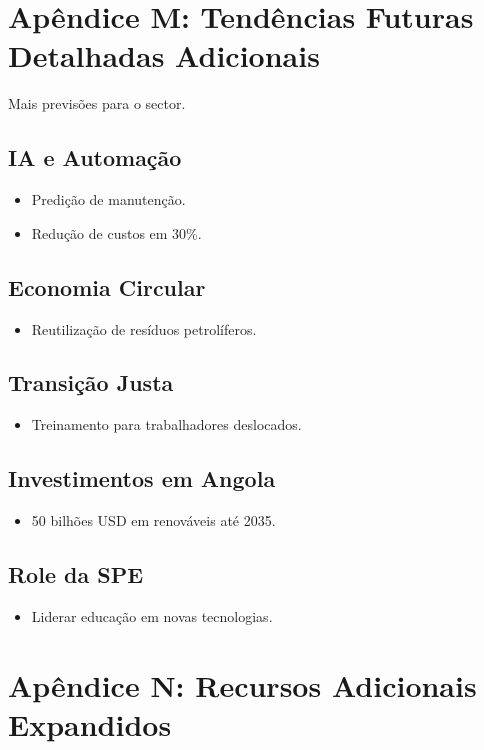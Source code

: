 \documentclass[12pt]{article}
\begin{document}
\clearpage
\section{Apêndice M: Tendências Futuras Detalhadas Adicionais}

Mais previsões para o sector.

\subsection{IA e Automação}
\begin{itemize}
    \item Predição de manutenção.
    \item Redução de custos em 30\%.
\end{itemize}

\subsection{Economia Circular}
\begin{itemize}
    \item Reutilização de resíduos petrolíferos.
\end{itemize}

\subsection{Transição Justa}
\begin{itemize}
    \item Treinamento para trabalhadores deslocados.
\end{itemize}

\subsection{Investimentos em Angola}
\begin{itemize}
    \item 50 bilhões USD em renováveis até 2035.
\end{itemize}

\subsection{Role da SPE}
\begin{itemize}
    \item Liderar educação em novas tecnologias.
\end{itemize}

\clearpage
\section{Apêndice N: Recursos Adicionais Expandidos}
\end{document}
